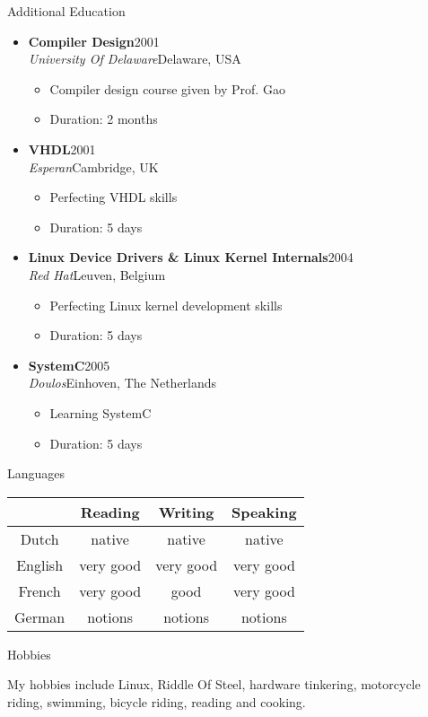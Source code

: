 \documentclass[12pt,oneside]{article}
\makeatletter
\newenvironment{ressection}[1]{
	\vspace{5pt}
	{\selectfont\Large#1}
	\begin{itemize}
	\vspace{5pt}
}{
	\end{itemize}
}
\newenvironment{hobbies}{
	\vspace{5pt}
	{\selectfont\Large Hobbies}
	\vspace{5pt}
	\begin{flushleft}
}{
	\end{flushleft}
	\vspace{5pt}
}
\newcommand{\ressubitem}[1]{
	\vspace{-4pt}
	\item \begin{flushleft} #1 \end{flushleft}
}
\newcommand{\resbigitem}[4]{
	\vspace{-5pt}
	\item
	\textbf{#1}\hfill#4 \\
	\textit{#2}\hfill#3
}
\newenvironment{ressubsec}[4]{
	\resbigitem{#1}{#2}{#3}{#4}
	\vspace{-2pt}
	\begin{itemize}
}{
	\end{itemize}
}
\newcommand{\langhdr}{
& Reading & Writing & Speaking \\
}
\newcommand{\lang}[4]{
#1 & #2 & #3 & #4 \\
}
\newenvironment{languages}{
	\vspace{5pt}
	\begin{minipage}{\textwidth}
	{\selectfont\Large Languages} \\
	\begin{center}
	\begin{tabular*}{0.75\textwidth}{@{\extracolsep{\fill}}cccc}
	\langhdr
	\hline
}{
	\end{tabular*}
	\end{center}
	\end{minipage}
	\vspace{5pt}
}
\makeatother
\begin{document}
\begin{ressection}{Additional Education}
	\begin{ressubsec}{Compiler Design}{University Of Delaware}{Delaware, USA}{2001}
		\ressubitem{Compiler design course given by Prof. Gao}
		\ressubitem{Duration: 2 months}
	\end{ressubsec}
	\begin{ressubsec}{VHDL}{Esperan}{Cambridge, UK}{2001}
		\ressubitem{Perfecting VHDL skills}
		\ressubitem{Duration: 5 days}
	\end{ressubsec}
	\begin{ressubsec}{Linux Device Drivers \& Linux Kernel Internals}{Red Hat}{Leuven, Belgium}{2004}
		\ressubitem{Perfecting Linux kernel development skills}
		\ressubitem{Duration: 5 days}
	\end{ressubsec}
	\begin{ressubsec}{SystemC}{Doulos}{Einhoven, The Netherlands}{2005}
		\ressubitem{Learning SystemC}
		\ressubitem{Duration: 5 days}
	\end{ressubsec}
\end{ressection}

\begin{languages}
\lang{Dutch}{native}{native}{native}
\lang{English}{very good}{very good}{very good}
\lang{French}{very good}{good}{very good}
\lang{German}{notions}{notions}{notions}
\end{languages}

\begin{hobbies}
My hobbies include Linux, Riddle Of Steel, hardware tinkering,
motorcycle riding, swimming, bicycle riding, reading and cooking.
\end{hobbies}
\end{document}
